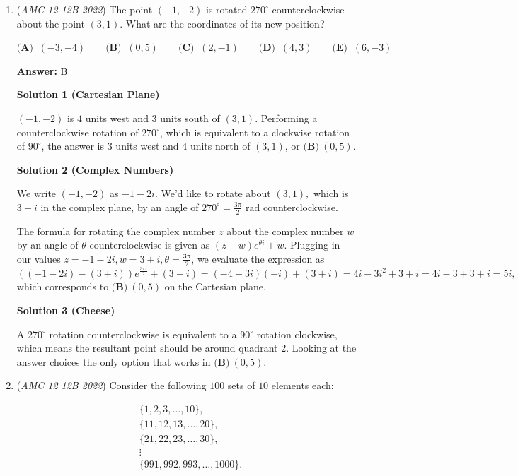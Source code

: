 \begin{enumerate}
 


	\item (\textit{AMC 12 12B 2022}) The point $(-1, -2)$ is rotated $270^{\circ}$ counterclockwise about the point $(3, 1)$. What are the coordinates of its new position?


 $\textbf{(A) }\ (-3, -4) \qquad \textbf{(B) }\ (0,5) \qquad \textbf{(C) }\ (2,-1) \qquad \textbf{(D) }\ (4,3) \qquad \textbf{(E) }\ (6,-3)$

 \textbf{Answer: }B



\textbf{Solution 1 (Cartesian Plane)}

$(-1,-2)$ is $4$ units west and $3$ units south of $(3,1)$. Performing a counterclockwise rotation of $270^{\circ}$, which is equivalent to a clockwise rotation of $90^{\circ}$, the answer is $3$ units west and $4$ units north of $(3,1)$, or $\boxed{\textbf{(B)}\ (0,5)}$.

 



\textbf{Solution 2 (Complex Numbers)}

We write $(-1, -2)$ as $-1-2i.$ We'd like to rotate about $(3, 1),$ which is $3+i$ in the complex plane, by an angle of $270^{\circ} = \frac{3\pi}{2} \text{ rad}$ counterclockwise.

 The formula for rotating the complex number $z$ about the complex number $w$ by an angle of $\theta$ counterclockwise is given as $(z-w)e^{\theta i} + w.$ Plugging in our values $z = -1-2i, w = 3+i, \theta = \frac{3\pi}{2}$, we evaluate the expression as $((-1-2i) - (3+i))e^{\frac{3\pi i}{2}} + (3+i) = (-4-3i)(-i) + (3+i) = 4i-3i^2+3+i = 4i-3+3+i = 5i,$ which corresponds to $\boxed{\textbf{(B)}\ (0,5)}$ on the Cartesian plane.

 


 



\textbf{Solution 3 (Cheese)}

A $270^{\circ}$ rotation counterclockwise is equivalent to a $90^{\circ}$ rotation clockwise, which means the resultant point should be around quadrant 2. Looking at the answer choices the only option that works in $\boxed{\textbf{(B)}\ (0,5)}$.

 


	\item (\textit{AMC 12 12B 2022}) Consider the following $100$ sets of $10$ elements each:

 \begin{align*} &\{1,2,3,\ldots,10\}, \\ &\{11,12,13,\ldots,20\},\\ &\{21,22,23,\ldots,30\},\\ &\vdots\\ &\{991,992,993,\ldots,1000\}. \end{align*}


\end{enumerate}

